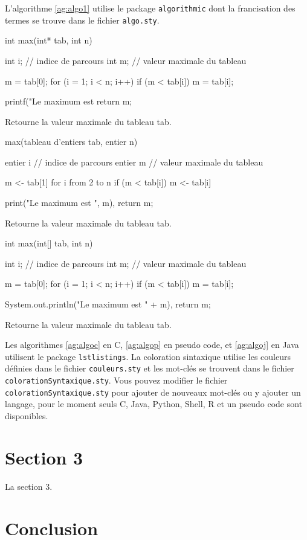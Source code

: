 L'algorithme \ref{ag:algo1} utilise le package \texttt{algorithmic} dont la francisation des termes se trouve dans le fichier \texttt{algo.sty}.

\begin{algorithm}
  \begin{CProg}
int max(int* tab, int n) {
  int i; // indice de parcours
  int m; // valeur maximale du tableau
  
  m = tab[0];
  for (i = 1; i < n; i++) {
    if (m < tab[i]) {
      m = tab[i];
    }
  }
  
  printf("Le maximum est %
  return m;
}
  \end{CProg}
  \caption[Algo en C]{Retourne la valeur maximale du tableau tab.\label{ag:algoc}}
\end{algorithm}

\begin{algorithm}
  \begin{PseudoCode}
max(tableau d'entiers tab, entier n) {
  entier i // indice de parcours
  entier m // valeur maximale du tableau
  
  m <- tab[1]
  for i from 2 to n {
    if (m < tab[i]) {
      m <- tab[i]
    }
  }
  
  print("Le maximum est ", m),
  return m;
}
  \end{PseudoCode}
  \caption[Algo en PseudoCode]{Retourne la valeur maximale du tableau tab.\label{ag:algop}}
\end{algorithm}

\begin{algorithm}
  \begin{Java}
int max(int[] tab, int n) {
  int i; // indice de parcours
  int m; // valeur maximale du tableau
  
  m = tab[0];
  for (i = 1; i < n; i++) {
    if (m < tab[i]) {
      m = tab[i];
    }
  }
  
  System.out.println("Le maximum est " + m),
  return m;
}
  \end{Java}
  \caption[Algo en Java]{Retourne la valeur maximale du tableau tab.\label{ag:algoj}}
\end{algorithm}

Les algorithmes \ref{ag:algoc} en C, \ref{ag:algop} en pseudo code, et \ref{ag:algoj} en Java utilisent le package \texttt{lstlistings}. La coloration sintaxique utilise les couleurs définies dans le fichier \texttt{couleurs.sty} et les mot-clés se trouvent dans le fichier \texttt{colorationSyntaxique.sty}. Vous pouvez modifier le fichier \texttt{colorationSyntaxique.sty} pour ajouter de nouveaux mot-clés ou y ajouter un langage, pour le moment seuls C, Java, Python, Shell, R et un pseudo code sont disponibles.

\section{Section 3}

La section 3.

\section{Conclusion}
